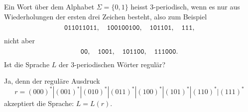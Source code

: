 Ein Wort über dem Alphabet $\Sigma=\{0,1\}$ heisst
3-periodisch, wenn es nur aus Wiederholungen der ersten drei Zeichen besteht,
also zum Beispiel
\[
\text{\tt 011011011},\quad
\text{\tt 100100100},\quad
\text{\tt 101101},\quad
\text{\tt 111},
\]
nicht aber
\[
\text{\tt 00},\quad
\text{\tt 1001},\quad
\text{\tt 101100},\quad
\text{\tt 111000}.
\]
Ist die Sprache $L$ der 3-periodischen Wörter regulär?


\begin{loesung}
Ja, denn der reguläre Ausdruck
\[
r=(000)^*|
(001)^*|
(010)^*|
(011)^*|
(100)^*|
(101)^*|
(110)^*|
(111)^*
\]
akzeptiert die Sprache: $L=L(r)$.
\end{loesung}
